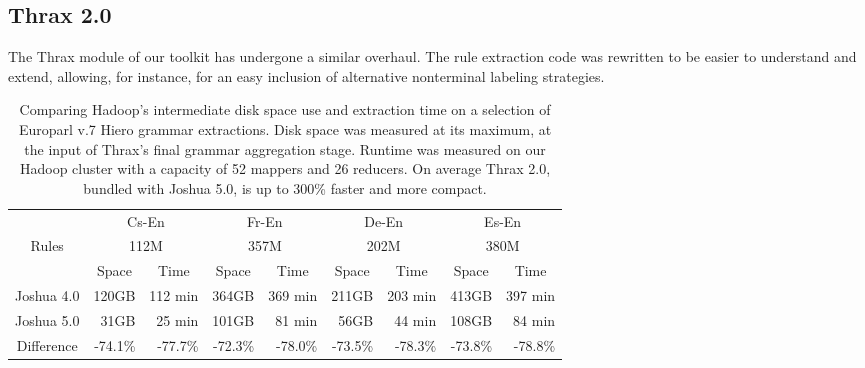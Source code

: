 \documentclass[11pt]{article}
\begin{document}
\subsection{Thrax 2.0}
\label{sec:thrax}

The Thrax module of our toolkit has undergone a similar overhaul. The
rule extraction code was rewritten to be easier to understand and
extend, allowing, for instance, for an easy inclusion of alternative
nonterminal labeling strategies.

\begin{table}[t]
  \begin{center}
    \begin{tabular}{|c|r|r|r|r|r|r|r|r|}
      \hline
      & \multicolumn{2}{c|}{Cs-En} & \multicolumn{2}{c|}{Fr-En} &
      \multicolumn{2}{c|}{De-En} & \multicolumn{2}{c|}{Es-En} \\

      Rules & \multicolumn{2}{c|}{112M} & \multicolumn{2}{c|}{357M} &
      \multicolumn{2}{c|}{202M} & \multicolumn{2}{c|}{380M} \\

      \hline

      & \multicolumn{1}{c|}{Space} & \multicolumn{1}{c|}{Time} &
      \multicolumn{1}{c|}{Space} & \multicolumn{1}{c|}{Time}  &
      \multicolumn{1}{c|}{Space} & \multicolumn{1}{c|}{Time}  &
      \multicolumn{1}{c|}{Space} &  \multicolumn{1}{c|}{Time} \\
      \hline
      \hline
      Joshua 4.0 & 120GB & 112 min & 364GB & 369 min & 211GB & 203 min & 413GB & 397 min \\
      \hline
      Joshua 5.0 & 31GB  & 25 min & 101GB  & 81 min & 56GB  & 44 min & 108GB & 84 min \\
      \hline
      \hline
      Difference & -74.1\% & -77.7\%  & -72.3\% & -78.0\%  & -73.5\% & -78.3\%  & -73.8\% & -78.8\% \\
      \hline
    \end{tabular}
  \end{center}
  \caption{Comparing Hadoop's intermediate disk space use and
    extraction time on a selection of Europarl v.7 Hiero grammar
    extractions. Disk space was measured at its maximum, at
    the input of Thrax's final grammar aggregation stage. Runtime was
    measured on our Hadoop cluster with a capacity of 52 mappers and
    26 reducers. On average Thrax 2.0, bundled with Joshua 5.0,
    is up to 300\% faster and more compact.}
  \label{tab-thrax-speed}
\end{table}
\end{document}
